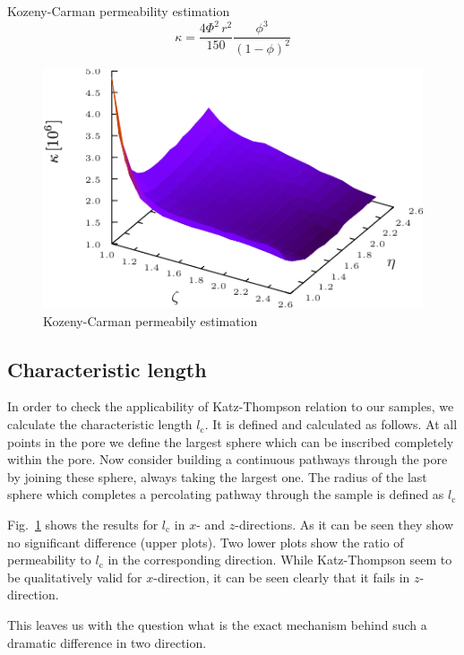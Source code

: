 \documentclass[aps,twocolumn,superscriptaddress,showpacs,showkeys]{revtex4-1}
\newcommand{\lc}{{l_{\mathrm{c}}}}  %
\begin{document}
Kozeny-Carman permeability estimation
%
\begin{equation}
\kappa = \frac{4 \Phi^{2}\,r^{2}}{150}\frac{\phi^{3}}{(1-\phi)^{2}}
\end{equation}
%

\begin{figure}
\includegraphics*[width=1.03\columnwidth]{data-figs/kozeny_carman}
\caption{
\label{fig:lc}
Kozeny-Carman permeabily estimation
}
\end{figure}

\subsection{Characteristic length}
\label{sec:lc}
In order to check the applicability of Katz-Thompson relation to our samples,
we calculate the characteristic length $\lc$. It is defined and calculated as
follows. At all points in the pore we define the largest sphere which can be
inscribed completely within the pore. Now consider building a continuous
pathways through the pore by joining these sphere, always taking the largest
one. The radius of the last sphere which completes a percolating pathway
through the sample is defined as $\lc$

Fig.~\ref{fig:lc} shows the results for $\lc$ in $x$- and $z$-directions.  As
it can be seen they show no significant difference (upper plots). Two lower
plots show the ratio of permeability to $\lc$ in the corresponding direction.
While Katz-Thompson seem to be qualitatively valid for $x$-direction, it can
be seen clearly that it fails in $z$-direction.

This leaves us with the question what is the exact mechanism behind such a
dramatic difference in two direction.
\end{document}
